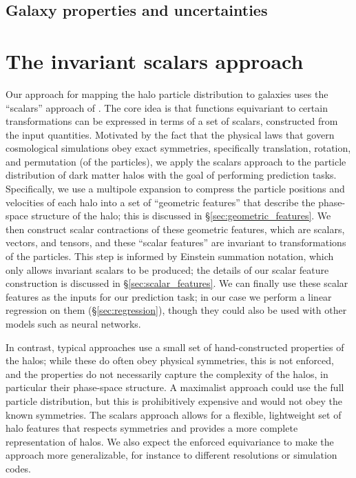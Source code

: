 \subsection{Galaxy properties and uncertainties}
\label{sec:galprops}




\section{The invariant scalars approach}
\label{sec:methods}

Our approach for mapping the halo particle distribution to galaxies uses the ``scalars'' approach of \cite{Villar2021a}.
The core idea is that functions equivariant to certain transformations can be expressed in terms of a set of scalars, constructed from the input quantities.  
Motivated by the fact that the physical laws that govern cosmological simulations obey exact symmetries, specifically translation, rotation, and permutation (of the particles), we apply the scalars approach to the particle distribution of dark matter halos with the goal of performing prediction tasks.
Specifically, we use a multipole expansion to compress the particle positions and velocities of each halo into a set of ``geometric features'' that describe the phase-space structure of the halo; this is discussed in \S\ref{sec:geometric_features}.
We then construct scalar contractions of these geometric features, which are scalars, vectors, and tensors, and these ``scalar features'' are invariant to transformations of the particles. 
This step is informed by Einstein summation notation, which only allows invariant scalars to be produced; the details of our scalar feature construction is discussed in \S\ref{sec:scalar_features}.
We can finally use these scalar features as the inputs for our prediction task; in our case we perform a linear regression on them (\S\ref{sec:regression}), though they could also be used with other models such as neural networks.

In contrast, typical approaches use a small set of hand-constructed properties of the halos; while these do often obey physical symmetries, this is not enforced, and the properties do not necessarily capture the complexity of the halos, in particular their phase-space structure.
A maximalist approach could use the full particle distribution, but this is prohibitively expensive and would not obey the known symmetries.
The scalars approach allows for a flexible, lightweight set of halo features that respects symmetries and provides a more complete representation of halos.
We also expect the enforced equivariance to make the approach more generalizable, for instance to different resolutions or simulation codes.


